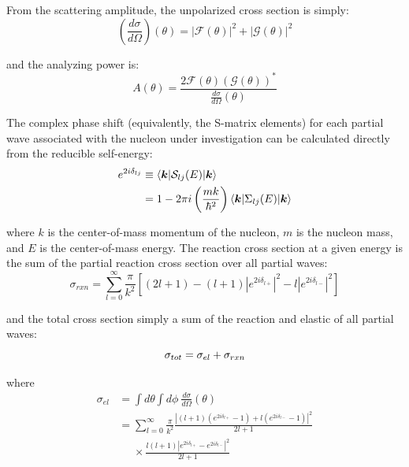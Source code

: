 \noindent
From the scattering amplitude, the unpolarized cross section is simply:
\begin{equation}
    \left(\frac{d\sigma}{d\Omega}\right)(\theta) = |\mathcal{F}(\theta)|^{2}
    +|\mathcal{G}(\theta)|^{2}
\end{equation}

\noindent
and the analyzing power is:
\begin{equation}
    A(\theta) = \frac{2\mathcal{F}(\theta)(\mathcal{G}(\theta))^{*}}
    {\frac{d\sigma}{d\Omega}(\theta)}
\end{equation}

\noindent
The complex phase shift (equivalently, the S-matrix elements) for each partial wave associated
with the nucleon under investigation can be
calculated directly from the reducible self-energy:
\begin{equation}
    \begin{split}
        e^{2i\delta_{lj}} & \equiv \braket{\bm{k}|\mathcal{S}_{lj}(E)|\bm{k}}\\
        & = 1 - 2\pi i \left(\frac{mk}{\hbar^{2}}\right) \braket{\bm{k}|\Sigma_{lj}(E)|\bm{k}}
    \end{split}
\end{equation}

\noindent
where $k$ is the center-of-mass momentum of the nucleon, $m$ is the nucleon mass, and $E$ is the
center-of-mass energy. The reaction cross section at a given energy is the sum of the partial
reaction cross section over all partial waves:
\begin{equation}
    \sigma_{rxn} = \sum^{\infty}_{l=0}\frac{\pi}{k^{2}}
    \left[(2l+1)-(l+1)|e^{2i\delta_{l+}}|^{2}-l|e^{2i\delta_{l-}}|^{2}\right]
\end{equation}

\noindent
and the total cross section simply a sum of the reaction and elastic of all partial waves:
\begin{equation}
    \sigma_{tot} = \sigma_{el} + \sigma_{rxn}\\
\end{equation}

\noindent
where
\begin{equation}
    \begin{split}
        \sigma_{el} & = \int d\theta \int d\phi\ \frac{d\sigma}{d\Omega}(\theta)\\
        & = \sum^{\infty}_{l=0}\frac{\pi}{k^{2}}
        \frac{|(l+1)(e^{2i\delta_{l+}}-1)+l(e^{2i\delta_{l-}}-1)|^{2}}{2l+1}\\
        & \phantom{ {}= } \times \frac{l(l+1)|e^{2i\delta_{l+}}-e^{2i\delta_{l-}}|^{2}}{2l+1}
    \end{split}
\end{equation}

